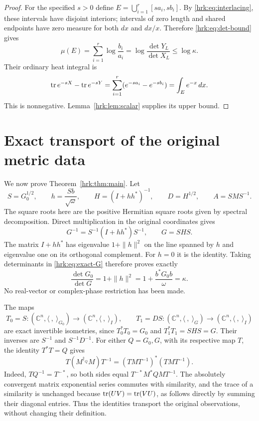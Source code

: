 \begin{proof}
For the specified $s>0$ define
$E=\bigcup_{i=1}^r[sa_i,sb_i]$. By \eqref{hrk:eq:interlacing}, these
intervals have disjoint interiors; intervals of zero length and
shared endpoints have zero measure for both $dx$ and $dx/x$.
Therefore \eqref{hrk:eq:det-bound} gives
\[
 \mu(E)=\sum_{i=1}^r\log\frac{b_i}{a_i}
       =\log\frac{\det Y_L}{\det X_L}\leq\log\kappa.
\]
Their ordinary heat integral is
\[
 \operatorname{tr} e^{-sX}-\operatorname{tr} e^{-sY}
   =\sum_{i=1}^r(e^{-sa_i}-e^{-sb_i})
   =\int_E e^{-x}\,dx.
\]
This is nonnegative. Lemma~\ref{hrk:lem:scalar} supplies its upper bound.
\end{proof}

\section{Exact transport of the original metric data}
We now prove Theorem~\ref{hrk:thm:main}. Let
\begin{equation}\label{hrk:eq:transport-data}
 S=G_0^{1/2},\qquad h=\frac{Sb}{\sqrt\omega},\qquad
 H=(I+hh^*)^{-1},\qquad D=H^{1/2},\qquad A=SMS^{-1}.
\end{equation}
The square roots here are the positive Hermitian square roots given
by spectral decomposition. Direct multiplication in the original
coordinates gives
\begin{equation}\label{hrk:eq:exact-G}
 G^{-1}=S^{-1}(I+hh^*)S^{-1},\qquad G=SHS.
\end{equation}
The matrix $I+hh^*$ has eigenvalue $1+\|h\|^2$ on the line spanned
by $h$ and eigenvalue one on its orthogonal complement. For $h=0$
it is the identity. Taking determinants in \eqref{hrk:eq:exact-G}
therefore proves exactly
\[
 \frac{\det G_0}{\det G}=1+\|h\|^2
                    =1+\frac{b^*G_0b}{\omega}=\kappa.
\]
No real-vector or complex-phase restriction has been made.

The maps
\begin{equation}\label{hrk:eq:isometries}
 T_0=S:(\mathbb C^n,\langle\ ,\ \rangle_{G_0})
          \longrightarrow(\mathbb C^n,\langle\ ,\ \rangle_I),
 \qquad
 T_1=DS:(\mathbb C^n,\langle\ ,\ \rangle_G)
          \longrightarrow(\mathbb C^n,\langle\ ,\ \rangle_I)
\end{equation}
are exact invertible isometries, since $T_0^*T_0=G_0$ and
$T_1^*T_1=SHS=G$. Their inverses are $S^{-1}$ and $S^{-1}D^{-1}$.
For either $Q=G_0,G$, with its respective map $T$, the identity
$T^*T=Q$ gives
\begin{equation}\label{hrk:eq:adjoint-intertwining}
 T(M^{\dagger_Q}M)T^{-1}
   =(TMT^{-1})^*(TMT^{-1}).
\end{equation}
Indeed, $TQ^{-1}=T^{-*}$, so both sides equal
$T^{-*}M^*QM T^{-1}$. The absolutely convergent matrix exponential
series commutes with similarity, and the trace of a similarity
is unchanged because $\operatorname{tr}(UV)=\operatorname{tr}(VU)$, as follows directly by
summing their diagonal entries. Thus the identities transport the
original observations, without changing their definition.

